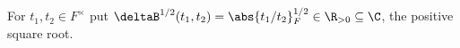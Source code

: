 For $t_1,t_2\in F^\times$ put $\deltaB^{1/2}(t_1,t_2)=\abs{t_1/t_2}_F^{1/2}\in\R_{>0}\subseteq\C$, the positive square root.
